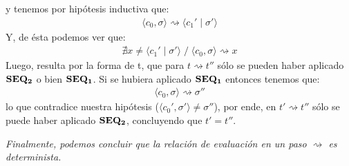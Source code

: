 \documentclass[a4paper,10pt]{article}
\begin{document}
\begin{itemize}
			y tenemos por hipótesis inductiva que:
				\begin{align*} \langle c_{0},\sigma\rangle \rightsquigarrow \langle c_{1}' \;|\; \sigma' \rangle \end{align*}
			Y, de ésta podemos ver que:
				\begin{align*} \nexists x \neq \langle c_{1}' \;|\; \sigma' \rangle \;{\big /}\; \langle c_{0},\sigma\rangle \rightsquigarrow x \end{align*}
			Luego, resulta por la forma de t, que para $t \rightsquigarrow t''$ sólo se pueden haber aplicado ${\bf SEQ_{2}}$ o bien ${\bf SEQ_{1}}$.
			Si se hubiera aplicado ${\bf SEQ_{1}}$ entonces tenemos que:
				\begin{align*} \langle c_{0},\sigma\rangle \rightsquigarrow \sigma'' \end{align*}
			lo que contradice nuestra hipótesis ($ \langle c_{0}',\sigma' \rangle \neq \sigma''$), por ende, en $t' \rightsquigarrow t''$ sólo se puede haber aplicado ${\bf SEQ_{2}}$, concluyendo que $t'= t''$.
	\end{itemize}
	
	\vspace{25pt}
	\emph{Finalmente, podemos concluir que la relación de evaluación en un paso $\rightsquigarrow$ es determinista.}
	\\
\end{document}
